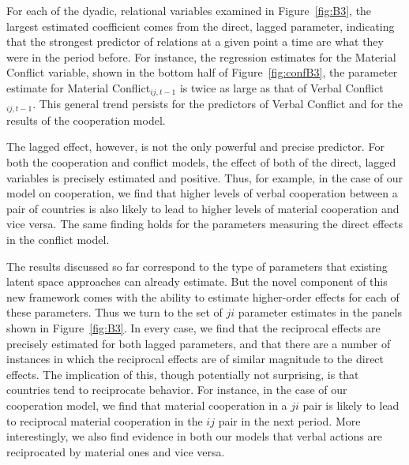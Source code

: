 \documentclass[3p,times,twocolumn,authoryear,12pt]{elsarticle}
\begin{document}
For each of the dyadic, relational variables examined in Figure~\ref{fig:B3}, the largest estimated coefficient comes from the direct, lagged parameter, indicating that the strongest predictor of relations at a given point a time are what they were in the period before. For instance, the regression estimates for the Material Conflict variable, shown in the bottom half of Figure~\ref{fig:confB3}, the parameter estimate for Material Conflict$_{ij, t-1}$ is twice as large as that of Verbal Conflict$_{ij, t-1}$. This general trend persists for the predictors of Verbal Conflict and for the results of the cooperation model. 

The lagged effect, however, is not the only powerful and precise predictor. For both the cooperation and conflict models, the effect of both of the direct, lagged variables is precisely estimated and positive. Thus, for example, in the case of our model on cooperation, we find that higher levels of verbal cooperation between a pair of countries is also likely to lead to higher levels of material cooperation and vice versa. The same finding holds for the parameters measuring the direct effects in the conflict model.

The results discussed so far correspond to the type of parameters that existing latent space approaches can already estimate. But the novel component of this new framework comes with the ability to estimate higher-order effects for each of these parameters. Thus we turn to the set of $ji$ parameter estimates in the panels shown in Figure~\ref{fig:B3}. In every case, we find that the reciprocal effects are precisely estimated for both lagged parameters, and that there are a number of instances in which the reciprocal effects are of similar magnitude to the direct effects. The implication of this, though potentially not surprising, is that countries tend to reciprocate behavior. For instance, in the case of our cooperation model, we find that material cooperation in a $ji$ pair is likely to lead to reciprocal material cooperation in the $ij$ pair in the next period. More interestingly, we also find evidence in both our models that verbal actions are reciprocated by material ones and vice versa. 
\end{document}
